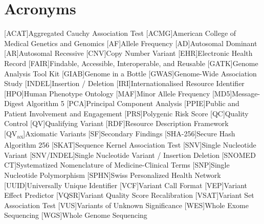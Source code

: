 \clearpage

\section*{Acronyms}
\renewenvironment{description}
{\list{}{\labelwidth0pt\itemindent-\leftmargin
    \parsep-1em\itemsep0pt\let\makelabel\descriptionlabel}}
               {\endlist}
\begin{acronym} 
 [ACAT]{Aggregated Cauchy Association Test }
 [ACMG]{American College of Medical Genetics and Genomics}
 [AF]{Allele Frequency}
 [AD]{Autosomal Dominant}
 [AR]{Autosomal Recessive}
  [CNV]{Copy Number Variant}
  \DIFaddbegin {}[EHR]{Electronic Health Record}
 \DIFaddend {}[FAIR]{Findable, Accessible, Interoperable, and Reusable}
 [GATK]{Genome Analysis Tool Kit}
  \DIFdelbegin %
\DIFdelend \DIFaddbegin {}[GIAB]{Genome in a Bottle}
 [GWAS]{Genome-Wide Association Study}
 \DIFaddend {}[INDEL]{Insertion / Deletion}
 [IRI]{Internationalised Resource Identifier}
 \DIFaddbegin {}[HPO]{Human Phenotype Ontology}
 \DIFaddend {}[MAF]{Minor Allele Frequency}
  \DIFdelbegin %
\DIFdelend \DIFaddbegin {}[MD5]{Message-Digest Algorithm 5}
  [PCA]{Principal Component Analysis} 
 [PPIE]{Public and Patient Involvement and Engagement}
 \DIFaddend {}[PRS]{Polygenic Risk Score} 
 [QC]{Quality Control}
 \DIFdelbegin %
\DIFdelend \DIFaddbegin {}[QV]{Qualifying Variant}
 \DIFaddend {}[RDF]{Resource Description Framework}
 [QV\textsubscript{ax}]{Axiomatic Variants}
 [SF]{Secondary Findings}
 [SHA-256]{Secure Hash Algorithm 256}
 \DIFdelbegin %
\DIFdelend \DIFaddbegin {}[SKAT]{Sequence Kernel Association Test} 
 [SNV]{Single Nucleotide Variant}
  \DIFaddend {}[SNV/INDEL]{Single Nucleotide Variant / Insertion Deletion}
  [SNOMED CT]{Systematized Nomenclature of Medicine-Clinical Terms}
 [SNP]{Single Nucleotide Polymorphism}
 [SPHN]{Swiss Personalized Health Network}
 [UUID]{Universally Unique Identifier}
 \DIFaddbegin {}[VCF]{Variant Call Format}
  \DIFaddend {}[VEP]{Variant Effect Predictor}
 [VQSR]{Variant Quality Score Recalibration}
 [VSAT]{Variant Set Association Test}
 [VUS]{Variants of Unknown Significance}
 \DIFaddbegin {}[WES]{Whole Exome Sequencing}
 \DIFaddend {}[WGS]{Whole Genome Sequencing}
\end{acronym}

